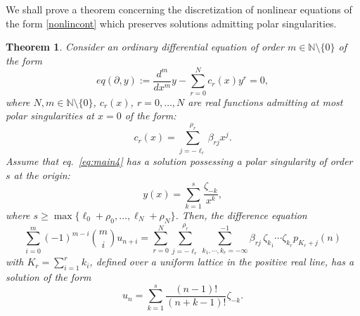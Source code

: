 \documentclass[10pt]{amsart}
\numberwithin{equation}{section}
\newtheorem{theorem}{Theorem}
\theoremstyle{definition}
\begin{document}
We shall prove a theorem concerning the discretization of nonlinear equations
of the form  \eqref{nonlincont} which preserves solutions admitting polar
singularities.
\begin{theorem}
\label{main4}
Consider an ordinary differential equation of order
$m\in \mathbb{N}\setminus \{0\}$ of the form
\begin{equation}
\label{eq:main4}
eq(\partial , y):=\frac{d^{m}}{dx^{m}}y-\sum _{r=0}^{N} c_{r}(x) y^{r}=0,
\end{equation}
where $N, m\in \mathbb{N}\setminus \{0\}$, $c_{r}(x)$,
$r=0,\ldots ,N$ are real functions admitting at most polar singularities at
$x=0$ of the form:
\begin{equation}
c_{r}(x)=\sum _{j=-\ell _{r}}^{\rho _{r}}\beta _{rj} x^{j}.
\label{eq8.12}
\end{equation}
Assume that eq.~\eqref{eq:main4} has a solution possessing a polar singularity
of order $s$ at the origin:
\begin{equation}
\label{eq:npolsol}
y(x)= \sum _{k=1}^{s}\frac{\zeta _{-k}}{x^{k}},
\end{equation}
where
$s\geq \max \{\ell _{0}+\rho _{0},\ldots ,\ell _{N}+\rho _{N} \}$. Then,
the difference equation
\begin{equation}
\label{eq:8.14}
\sum _{i=0}^{m}(-1)^{m-i}\binom{m}{i}u_{n+i}=\sum _{r=0}^{N} \sum _{j=-
\ell _{r}}^{\rho _{r}} \sum _{k_{1},\cdots ,k_{r}=-\infty}^{-1}
\beta _{rj} \, \zeta _{k_{1}}\cdots \zeta _{k_{r}}p_{K_r+j}(n)
\end{equation}
with $K_{r}=\sum _{i=1}^{r} k_{i}$, defined over a uniform lattice in the positive real line, has a
solution of the form
\begin{equation}
\label{eq:8.15}
u_{n}=\sum _{k=1}^{s}\frac{(n-1)!}{(n+k-1)!}\zeta _{-k}.
\end{equation}
\end{theorem}
\end{document}
